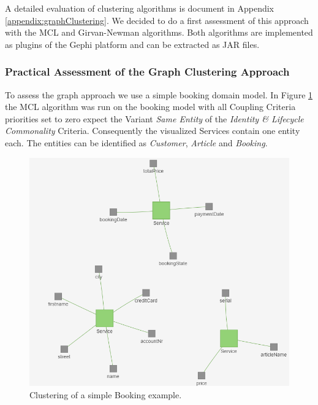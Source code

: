 A detailed evaluation of clustering algorithms is document in Appendix \ref{appendix:graphClustering}. We decided to do a first assessment of this approach with the MCL\cite{mcl} and Girvan-Newman\cite{girvanNewman} algorithms. Both algorithms are implemented as plugins of the Gephi\cite{gephi} platform and can be extracted as \gls{JAR} files.

\subsubsection{Practical Assessment of the Graph Clustering Approach}

To assess the graph approach we use a simple booking domain model. In Figure \ref{fig:clusteringBookingSimple} the MCL algorithm was run on the booking model with all Coupling Criteria priorities set to zero expect the Variant \textit{Same Entity} of the \textit{Identity \& Lifecycle Commonality} Criteria. Consequently the visualized Services contain one entity each. The entities can be identified as \textit{Customer}, \textit{Article} and \textit{Booking}.

\begin{figure}[H]
	\begin{center}
		\includegraphics[scale=0.8]{images/booking_entities.png}
	\end{center}
	\caption{Clustering of a simple Booking example.}
	\label{fig:clusteringBookingSimple}
\end{figure}



